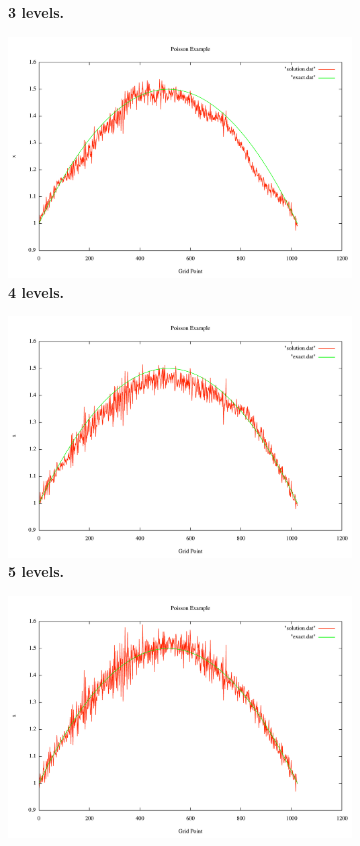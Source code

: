 \documentclass[note]{TechNote}
\begin{document}
\begin{figure}[h!]
\begin{subfigure}[b]{0.32\textwidth}
    \caption{\textbf{3 levels.}}
  \end{subfigure}
  \begin{subfigure}[b]{0.32\textwidth}
    \includegraphics[width=\textwidth]{7_sec_4_level.pdf}
    \caption{\textbf{4 levels.}}
  \end{subfigure}
  \begin{subfigure}[b]{0.32\textwidth}
    \includegraphics[width=\textwidth]{7_sec_5_level.pdf}
    \caption{\textbf{5 levels.}}
  \end{subfigure}
  \begin{subfigure}[b]{0.32\textwidth}
    \includegraphics[width=\textwidth]{7_sec_6_level.pdf}

\end{subfigure}
\end{figure}
\end{document}
